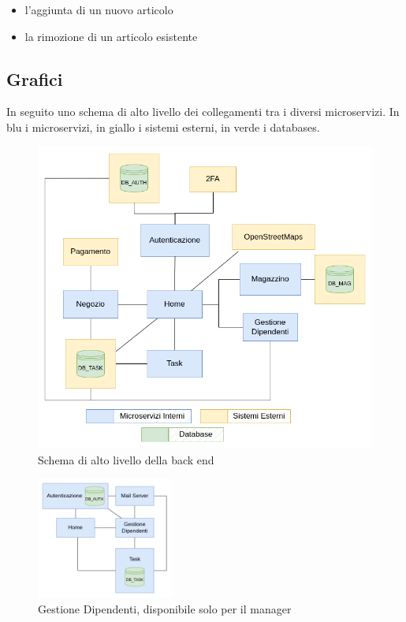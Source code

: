 \documentclass{report}
\begin{document}
\begin{itemize}
	\item l’aggiunta di un nuovo articolo
	
	\item la rimozione di un articolo esistente
\end{itemize}

\subsection{Grafici}

In seguito uno schema di alto livello dei collegamenti tra i diversi microservizi. In blu i microservizi, in giallo i sistemi esterni, in verde i databases.

\begin{figure}[H]
	\includegraphics[width=1\textwidth]{images/back_end_short}
	\caption{Schema di alto livello della back end}
\end{figure}	

\iffalse
\begin{figure}[H]
	\centering
	\includegraphics[width=0.4\textwidth]{images/admin_back_end}
	\caption{Gestione Dipendenti, disponibile solo per il manager}
\end{figure}
\end{document}
